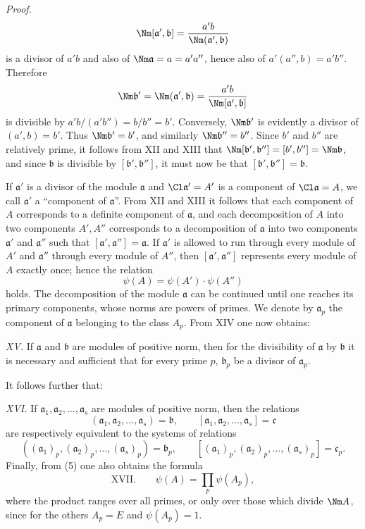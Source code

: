 \emph{Proof.}
\[
 \Nm[\mathfrak a',\mathfrak b]
 ={a'b\over \Nm(\mathfrak a',\mathfrak b)}
\]
is a divisor of $a'b$ and also of $\Nm\mathfrak a=a=a'a''$, hence also of $a'(a'',b)=a'b''$. Therefore
\[
 \Nm\mathfrak b'=\Nm(\mathfrak a',\mathfrak b)
 ={a'b\over \Nm[\mathfrak a',\mathfrak b]}
\]
is divisible by $a'b/(a'b'')=b/b''=b'$. Conversely, $\Nm\mathfrak b'$ is evidently a divisor of $(a',b)=b'$. Thus $\Nm\mathfrak b'=b'$, and similarly $\Nm\mathfrak b''=b''$. Since $b'$ and $b''$ are relatively prime, it follows from XII and XIII that $\Nm[\mathfrak b',\mathfrak b'']=[b',b'']=\Nm\mathfrak b$, and since $\mathfrak b$ is divisible by $[\mathfrak b',\mathfrak b'']$, it must now be that $[\mathfrak b',\mathfrak b'']=\mathfrak b$.

If $\mathfrak a'$ is a divisor of the module $\mathfrak a$ and $\Cl\mathfrak a'=A'$ is a component of $\Cl\mathfrak a=A$, we call $\mathfrak a'$ a ``component of $\mathfrak a$''. From XII and XIII it follows that each component of $A$ corresponds to a definite component of $\mathfrak a$, and each decomposition of $A$ into two components $A',A''$ corresponds to a decomposition of $\mathfrak a$ into two components $\mathfrak a'$ and $\mathfrak a''$ such that $[\mathfrak a',\mathfrak a'']=\mathfrak a$. If $\mathfrak a'$ is allowed to run through every module of $A'$ and $\mathfrak a''$ through every module of $A''$, then $[\mathfrak a',\mathfrak a'']$ represents every module of $A$ exactly once; hence the relation
\begin{equation}
 \psi(A)=\psi(A')\cdot\psi(A'')
\tag{5}
\end{equation}
holds. The decomposition of the module $\mathfrak a$ can be continued until one reaches its primary components, whose norms are powers of primes. We denote by $\mathfrak a_p$ the component of $\mathfrak a$ belonging to the class $A_p$. From XIV one now obtains:

\emph{XV.} If $\mathfrak a$ and $\mathfrak b$ are modules of positive norm, then for the divisibility of $\mathfrak a$ by $\mathfrak b$ it is necessary and sufficient that for every prime $p$, $\mathfrak b_p$ be a divisor of $\mathfrak a_p$.

It follows further that:

\emph{XVI.} If $\mathfrak a_1,\mathfrak a_2,\ldots,\mathfrak a_s$ are modules of positive norm, then the relations
\[
 (\mathfrak a_1,\mathfrak a_2,\ldots,\mathfrak a_s)=\mathfrak b,
 \qquad
 [\mathfrak a_1,\mathfrak a_2,\ldots,\mathfrak a_s]=\mathfrak c
\]
are respectively equivalent to the systems of relations
\[
 ((\mathfrak a_1)_p,(\mathfrak a_2)_p,\ldots,(\mathfrak a_s)_p)=\mathfrak b_p,
 \qquad
 [(\mathfrak a_1)_p,(\mathfrak a_2)_p,\ldots,(\mathfrak a_s)_p]=\mathfrak c_p.
\]
Finally, from (5) one also obtains the formula
\[
\text{XVII.}\qquad \psi(A)=\prod_p \psi(A_p),
\]
where the product ranges over all primes, or only over those which divide $\Nm A$, since for the others $A_p=E$ and $\psi(A_p)=1$.

